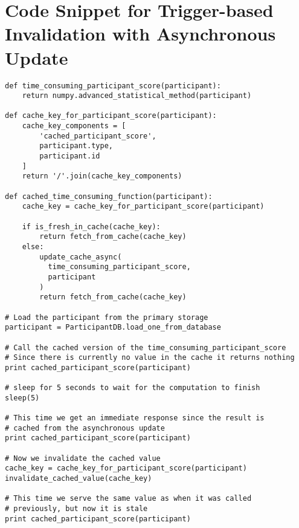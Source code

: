 \chapter{Code Snippet for Trigger-based Invalidation with Asynchronous Update}
\label{appendix:code:trigger-based-invalidation-with-asynchronous-update}

\begin{verbatim}
def time_consuming_participant_score(participant):
    return numpy.advanced_statistical_method(participant)

def cache_key_for_participant_score(participant):
    cache_key_components = [
        'cached_participant_score',
        participant.type,
        participant.id
    ]
    return '/'.join(cache_key_components)

def cached_time_consuming_function(participant):
    cache_key = cache_key_for_participant_score(participant)

    if is_fresh_in_cache(cache_key):
        return fetch_from_cache(cache_key)
    else:
        update_cache_async(
          time_consuming_participant_score,
          participant
        )
        return fetch_from_cache(cache_key)

# Load the participant from the primary storage
participant = ParticipantDB.load_one_from_database

# Call the cached version of the time_consuming_participant_score
# Since there is currently no value in the cache it returns nothing
print cached_participant_score(participant)

# sleep for 5 seconds to wait for the computation to finish
sleep(5)

# This time we get an immediate response since the result is
# cached from the asynchronous update
print cached_participant_score(participant)

# Now we invalidate the cached value
cache_key = cache_key_for_participant_score(participant)
invalidate_cached_value(cache_key)

# This time we serve the same value as when it was called
# previously, but now it is stale
print cached_participant_score(participant)
\end{verbatim}

